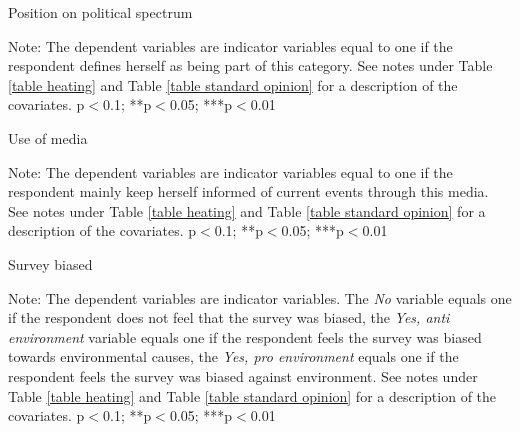 \documentclass{article}
\begin{document}
\begin{landscape}
	\begin{table}[h!]
	\caption{Position on political spectrum}
	\begin{center}
		\scalebox{0.6}{}
	\end{center}
	{\footnotesize Note: The dependent variables are indicator variables equal to one if the respondent defines herself as being part of this category. See notes under Table \ref{table heating} and Table \ref{table standard opinion} for a description of the covariates.
	\newline *p$<$0.1; **p$<$0.05; ***p$<$0.01}
\end{table}	
\end{landscape}


\begin{table}[h!]
	\caption{Use of media}
	\begin{center}
		\scalebox{0.7}{}
	\end{center}
	{\footnotesize Note: The dependent variables are indicator variables equal to one if the respondent mainly keep herself informed of current events through this media. See notes under Table \ref{table heating} and Table \ref{table standard opinion} for a description of the covariates.
	\newline *p$<$0.1; **p$<$0.05; ***p$<$0.01}
\end{table}	

\begin{table}[h!]
	\caption{Survey biased}
	\begin{center}
		\scalebox{0.7}{}
	\end{center}
	{\footnotesize Note: The dependent variables are indicator variables. The \textit{No} variable equals one if the respondent does not feel that the survey was biased, the \textit{Yes, anti environment} variable equals one if the respondent feels the survey was biased towards environmental causes, the \textit{Yes, pro environment} equals one if the respondent feels the survey was biased against environment. See notes under Table \ref{table heating} and Table \ref{table standard opinion} for a description of the covariates.
	\newline *p$<$0.1; **p$<$0.05; ***p$<$0.01}
\end{table}	
\end{document}
